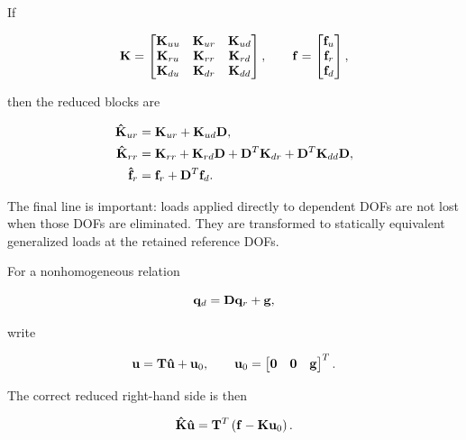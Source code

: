 If

\begin{equation}
\mathbf{K}=
\begin{bmatrix}
\mathbf{K}_{uu}&\mathbf{K}_{ur}&\mathbf{K}_{ud}\\
\mathbf{K}_{ru}&\mathbf{K}_{rr}&\mathbf{K}_{rd}\\
\mathbf{K}_{du}&\mathbf{K}_{dr}&\mathbf{K}_{dd}
\end{bmatrix},
\qquad
\mathbf{f}=
\begin{bmatrix}
\mathbf{f}_u\\\mathbf{f}_r\\\mathbf{f}_d
\end{bmatrix},
\end{equation}

then the reduced blocks are

\begin{equation}\label{rbe2-reduced-blocks}
\begin{aligned}
    \mathbf{\hat{K}}_{ur}
        &=\mathbf{K}_{ur}+\mathbf{K}_{ud}\mathbf{D},\\
    \mathbf{\hat{K}}_{rr}
        &=\mathbf{K}_{rr}
          +\mathbf{K}_{rd}\mathbf{D}
          +\mathbf{D}^{T}\mathbf{K}_{dr}
          +\mathbf{D}^{T}\mathbf{K}_{dd}\mathbf{D},\\
    \mathbf{\hat{f}}_r
        &=\mathbf{f}_r+\mathbf{D}^{T}\mathbf{f}_d.
\end{aligned}
\end{equation}

The final line is important: loads applied directly to dependent DOFs are not
lost when those DOFs are eliminated. They are transformed to statically
equivalent generalized loads at the retained reference DOFs.

For a nonhomogeneous relation

\begin{equation}
    \mathbf{q}_d=\mathbf{D}\mathbf{q}_r+\mathbf{g},
\end{equation}

write

\begin{equation}
    \mathbf{u}=\mathbf{T}\mathbf{\hat{u}}+\mathbf{u}_0,
    \qquad
    \mathbf{u}_0=\begin{bmatrix}\mathbf{0}&\mathbf{0}&\mathbf{g}\end{bmatrix}^{T}.
\end{equation}

The correct reduced right-hand side is then

\begin{equation}\label{rbe2-affine-transformation}
    \mathbf{\hat{K}}\mathbf{\hat{u}}
    =\mathbf{T}^{T}\left(\mathbf{f}-\mathbf{K}\mathbf{u}_0\right).
\end{equation}

